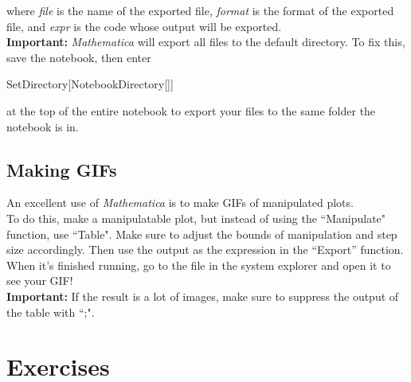 \documentclass[11pt,letterpaper,twoside,titlepage]{report}
\newcommand{\Mathematica}{\textit{Mathematica} }
\begin{document}
			where \textit{file} is the name of the exported file, \textit{format} is the format of the exported file, and \textit{expr} is the code whose output will be exported. \\
			
			\textbf{Important:} \Mathematica will export all files to the default directory.  To fix this, save the notebook, then enter
			
			\begin{center}
			
				SetDirectory[NotebookDirectory[]]
			
			\end{center}
			
			at the top of the entire notebook to export your files to the same folder the notebook is in.
			
			\section{Making GIFs}
			
				An excellent use of \Mathematica is to make GIFs of manipulated plots. \\
				
				To do this, make a manipulatable plot, but instead of using the ``Manipulate" function, use ``Table".  Make sure to adjust the bounds of manipulation and step size accordingly.  Then use the output as the expression in the ``Export'' function. \\
				
				When it's finished running, go to the file in the system explorer and open it to see your GIF! \\
				
				\textbf{Important:} If the result is a lot of images, make sure to suppress the output of the table with ``;".
			
		\chapter{Exercises}
		
\end{document}
